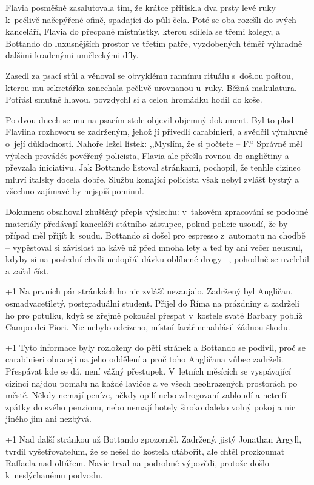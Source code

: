 Flavia posměšně zasalutovala tím, že krátce přitiskla dva prsty levé ruky k pečlivě načepýřené ofině, spadající do půli čela. Poté se oba rozešli do svých kanceláří, Flavia do přecpané místnůstky, kterou sdílela se třemi kolegy, a Bottando do luxusnějších prostor ve třetím patře, vyzdobených téměř výhradně dalšími kradenými uměleckými díly.

Zasedl za psací stůl a věnoval se obvyklému rannímu rituálu s došlou poštou, kterou mu sekretářka zanechala pečlivě urovnanou u~ruky. Běžná makulatura. Potřásl smutně hlavou, povzdychl si a celou hromádku hodil do koše.

Po dvou dnech se mu na psacím stole objevil objemný dokument. Byl to plod Flaviina rozhovoru se zadrženým, jehož jí přivedli carabinieri, a svědčil výmluvně o~její důkladnosti. Nahoře ležel lístek: ,,Myslím, že si počtete -- F.`` Správně měl výslech provádět pověřený policista, Flavia ale přešla rovnou do angličtiny a převzala iniciativu. Jak Bottando listoval stránkami, pochopil, že tenhle cizinec mluví italsky docela dobře. Službu konající policista však nebyl zvlášť bystrý a všechno zajímavé by nejspíš pominul.

Dokument obsahoval zhuštěný přepis výslechu: v takovém zpracování se podobné materiály předávají kanceláři státního zástupce, pokud policie usoudí, že by případ měl přijít k soudu. Bottando si došel pro espresso z automatu na chodbě -- vypěstoval si závislost na kávě už před mnoha lety a teď by ani večer neusnul, kdyby si na poslední chvíli nedopřál dávku oblíbené drogy --, pohodlně se uvelebil a začal číst.

\noindent
\looseness+1 Na prvních pár stránkách ho nic zvlášť nezaujalo. Zadržený byl Angličan, osmadvacetiletý, postgraduální student. Přijel do Říma na prázdniny a zadrželi ho pro potulku, když se zřejmě pokoušel přespat v kostele svaté Barbary poblíž Campo dei Fiori. Nic nebylo odcizeno, místní farář nenahlásil žádnou škodu.

\looseness+1 Tyto informace byly rozloženy do pěti stránek a Bottando se podivil, proč se carabinieri obracejí na jeho oddělení a proč toho Angličana vůbec zadrželi. Přespávat kde se dá, není vážný přestupek. V letních měsících se vyspávající cizinci najdou pomalu na každé lavičce a ve všech neohrazených prostorách po městě. Někdy nemají peníze, někdy opilí nebo zdrogovaní zabloudí a netrefí zpátky do svého penzionu, nebo nemají hotely široko daleko volný pokoj a nic jiného jim ani nezbývá.

\looseness+1 Nad další stránkou už Bottando zpozorněl. Zadržený, jistý Jonathan Argyll, tvrdil vyšetřovatelům, že se nešel do kostela utábořit, ale chtěl prozkoumat Raffaela nad oltářem. Navíc trval na podrobné výpovědi, protože došlo k neslýchanému podvodu.

